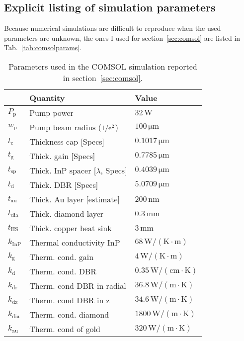 \subsection{Explicit listing of simulation parameters}
\label{app:comsolparams}

Because numerical simulations are difficult to reproduce
when the used parameters are unknown,
the ones I used for section~\ref{sec:comsol}
are listed in Tab.~\ref{tab:comsolparams}.

\begin{table}[h]
\centering
\caption{Parameters used in the COMSOL simulation
reported in section~\ref{sec:comsol}.}
\begin{tabular}{lll}
\hline
 & Quantity & Value \\
\hline
$P_\mathrm{p}$ & Pump power & $32\,\mathrm{W}$ \\
$w_\mathrm{p}$ & Pump beam radius ($1/\mathrm{e}^2$) & $100\,\mathrm{\mu m}$ \\
$t_\mathrm{c}$ & Thickness cap [Specs] & $0.1017\,\mathrm{\mu m}$ \\
$t_\mathrm{g}$ & Thick. gain [Specs] & $0.7785\,\mathrm{\mu m}$ \\
$t_\mathrm{sp}$ & Thick. InP spacer [$\lambda$, Specs] & $0.4039\,\mathrm{\mu m}$ \\
$t_\mathrm{d}$ & Thick. DBR [Specs] & $5.0709\,\mathrm{\mu m}$ \\
$t_\mathrm{au}$ & Thick. Au layer [estimate] & $200\,\mathrm{nm}$ \\
$t_\mathrm{dia}$ & Thick. diamond layer & $0.3\,\mathrm{mm}$ \\
$t_\mathrm{HS}$ & Thick. copper heat sink & $3\,\mathrm{mm}$ \\
$k_\mathrm{InP}$ & Thermal conductivity InP \cite{Piprek2002} & $68\,\mathrm{W/(K\cdot m)}$ \\
$k_\mathrm{g}$ & Therm. cond. gain \cite{Piprek2002} & $4\,\mathrm{W/(K\cdot m)}$ \\
$k_\mathrm{d}$ & Therm. cond. DBR \cite{Piprek1998} & $0.35\,\mathrm{W/(cm\cdot K)}$ \\
$k_\mathrm{dr}$ & Therm. cond DBR in radial \cite{Vetter2012,ioffe,Piprek1998} & $36.8\,\mathrm{W/(m\cdot K)}$ \\
$k_\mathrm{dz}$ & Therm. cond DBR in z \cite{Vetter2012,ioffe,Piprek1998} & $34.6\,\mathrm{W/(m\cdot K)}$ \\
$k_\mathrm{dia}$ & Therm. cond. diamond \cite{Ranta2014OptLett} & $1800\,\mathrm{W/(m\cdot K)}$ \\
$k_\mathrm{au}$ & Therm. cond of gold \cite{SpringerMat} & $320\,\mathrm{W/(m\cdot K)}$ \\

\end{tabular}
\end{table}
